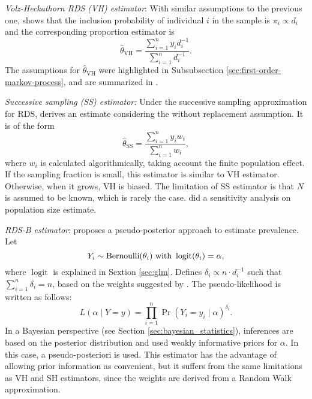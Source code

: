 \begin{alineas}
  \item {\em Volz-Heckathorn RDS (VH) estimator}: With similar assumptions to the
  previous one, \textcite[p. 85]{volz2008probability} shows that the inclusion
   probability of individual $i$ in the sample is $\pi_i \propto
  d_i$ and the corresponding proportion estimator is  
  \begin{equation}
    \hat{\theta}_{\mathrm{VH}} = \frac{\sum_{i=1}^n y_i d_i^{-1}}{\sum_{i=1}^n d_i^{-1}}.
  \end{equation}
  The assumptions for $\hat{\theta}_{\mathrm{VH}}$ were highlighted in Subsubsection
  \ref{sec:first-order-markov-process}, and are summarized in \cite[Table
  1][p. 71]{gile2018methods}. 
  
  \item {\em Successive sampling (SS) estimator:} Under the successive sampling
  approximation for RDS, \textcite[p. 137-138]{gile2011improved} derives an
  estimate considering the without replacement assumption. It is of the form 
  \begin{equation}
    \label{eq:successive-sampling-estimator}
    \hat{\theta}_{\mathrm{SS}} = \frac{\sum_{i=1}^n y_i w_i}{\sum_{i=1}^n w_i}, 
  \end{equation}
  where $w_i$ is calculated algorithmically, taking account the finite
  population effect. If the sampling fraction is small, this estimator is
  similar to VH estimator. Otherwise, when it grows, VH is biased. The
  limitation of SS estimator is that $N$ is assumed to be known, which is
  rarely the case. \textcite[p. 140]{gile2011improved} did a sensitivity
  analysis on population size estimate. 

  \item {\em RDS-B estimator}: \cite{bastos2018hiv} proposes a
  pseudo-posterior approach to estimate prevalence. Let 
  \begin{equation*}
    Y_i \sim \operatorname{Bernoulli}(\theta_i) \text{ with } \operatorname{logit}(\theta_i) = \alpha,
  \end{equation*}  
  where $\operatorname{logit}$ is explained in Sextion \ref{sec:glm}. Defines 
  $\delta_i \propto n \cdot d_i^{-1}$ such that $\sum_{i=1}^n \delta_i = n$,
  based on the weights suggested by \textcite{volz2008probability}. The
  pseudo-likelihood is written as follows: 
  \begin{equation*}
    L(\alpha \mid Y = y) = \prod_{i=1}^n \Pr(Y_i = y_i \mid \alpha)^{\delta_i}. 
  \end{equation*}
  In a Bayesian perspective (see Section \ref{sec:bayesian_statistics}), 
  inferences are based on the posterior distribution and 
  \textcite[p. S18]{bastos2018hiv} used weakly informative priors for
  $\alpha$. In this case, a pseudo-posteriori is used. This estimator has the
  advantage of allowing prior information as convenient, but it suffers from
  the same limitations as VH and SH estimators, since the weights are derived
  from a Random Walk approximation. 

\end{alineas}

